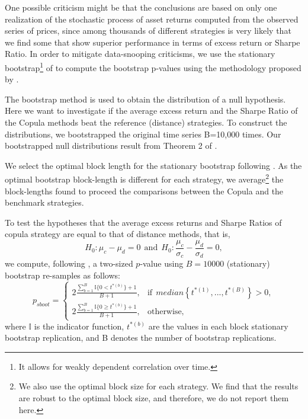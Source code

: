 \documentclass[a4paper]{article}
\begin{document}
	One possible criticism might be that the conclusions are based on only one realization of the stochastic process of asset returns computed from the observed series of prices, since among thousands of different strategies is very likely that we find some that show superior performance in terms of excess return or Sharpe Ratio. In order to mitigate data-snooping criticisms, we use the stationary bootstrap\footnote{It allows for weakly dependent correlation over time.} of \citet*{pr94} to compute the bootstrap p-values using the methodology proposed by \citet*{lw08}.
	
	The bootstrap method is used to obtain the distribution of a null hypothesis. Here we want to investigate if the average excess return and the Sharpe Ratio of the Copula methods beat the reference (distance) strategies. To construct the distributions, we bootstrapped the original time series B=10,000 times. Our bootstrapped null distributions result from Theorem 2 of \citet*{pr94}.
	
	We select the optimal block length for the stationary bootstrap following \citet*{pw04}. As the optimal bootstrap block-length is different for each strategy, we average\footnote{We also use the optimal block size for each strategy. We find that the results are robust to the optimal block size, and therefore, we do not report them here.} the block-lengths found to proceed the comparisons between the Copula and the benchmark strategies.
	
	To test the hypotheses that the average excess returns and Sharpe Ratios of copula strategy are equal to that of distance methods, that is,
	\begin{equation}
	H_{0}:\mu_{c}-\mu_{d}=0  \ \ \textrm{and}
	\ \  H_{0}:\frac{\mu_{c}}{\sigma_{c}}-\frac{\mu_{d}}{\sigma_{d}}=0,
	\label{eq:eq153}
	\end{equation}
	we compute, following \citet*{davison1997}, a two-sized $p$-value using $B=10000$ (stationary) bootstrap re-samples as follows:
	\begin{equation}
	p_{sboot}=
	\begin{cases}
	2\frac{\sum_{b=1}^{B}\mathbb{I}\{0< t^{\ast(b)}\}+1}{B+1}, &\text{if} ~~median\left\{ t^{\ast \left( 1\right) },...,t^{\ast \left( B\right)}\right\} > 0, \\
	2\frac{\sum_{b=1}^{B}\mathbb{I}\{0\geq t^{\ast(b)}\}+1}{B+1}, &\text{otherwise},
	\end{cases}
	\label{eq:eq152}
	\end{equation}
	where $\mathbb{I}$ is the indicator function, $t^{\ast(b)}$ are the values in each block stationary bootstrap replication, and B denotes the number of bootstrap replications.
	
\end{document}
